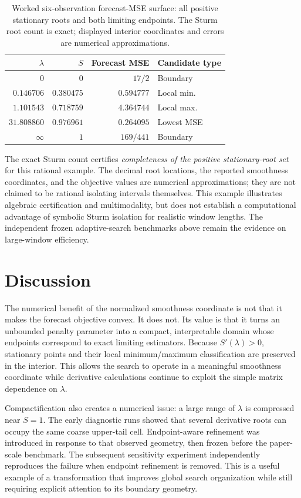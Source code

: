 \documentclass[english]{smcca}
\begin{document}
\begin{table}[t]
\centering
\caption{Worked six-observation forecast-MSE surface:
all positive stationary roots and both limiting endpoints.
The Sturm root count is exact; displayed interior
coordinates and errors are numerical approximations.}
\label{tab:sturm_example}
\begin{tabular}{@{}rrrl@{}}
\toprule
$\lambda$ & $S$ & Forecast MSE & Candidate type\\
\midrule
$0$ & $0$ & $17/2$ & Boundary\\
$0.146706$ & $0.380475$ & $0.594777$ & Local min.\\
$1.101543$ & $0.718759$ & $4.364744$ & Local max.\\
$31.808860$ & $0.976961$ & $\mathbf{0.264095}$ & Lowest MSE\\
$\infty$ & $1$ & $169/441$ & Boundary\\
\bottomrule
\end{tabular}
\end{table} The exact Sturm count certifies
\emph{completeness of the positive stationary-root set}
for this rational example. The decimal root locations,
the reported smoothness coordinates, and the objective
values are numerical approximations; they are not
claimed to be rational isolating intervals themselves.
This example illustrates algebraic certification and
multimodality, but does not establish a computational
advantage of symbolic Sturm isolation for realistic
window lengths. The independent frozen adaptive-search
benchmarks above remain the evidence on large-window
efficiency.

\section{Discussion}

The numerical benefit of the normalized smoothness coordinate is not that it makes the forecast objective convex. It does not. Its value is that it turns an unbounded penalty parameter into a compact, interpretable domain whose endpoints correspond to exact limiting estimators. Because \(S'(\lambda)>0\), stationary points and their local minimum/maximum classification are preserved in the interior. This allows the search to operate in a meaningful smoothness coordinate while derivative calculations continue to exploit the simple matrix dependence on \(\lambda\).

Compactification also creates a numerical issue: a large range of \(\lambda\) is compressed near \(S=1\). The early diagnostic runs showed that several derivative roots can occupy the same coarse upper-tail cell. Endpoint-aware refinement was introduced in response to that observed geometry, then frozen before the paper-scale benchmark. The subsequent sensitivity experiment independently reproduces the failure when endpoint refinement is removed. This is a useful example of a transformation that improves global search organization while still requiring explicit attention to its boundary geometry.
\end{document}
